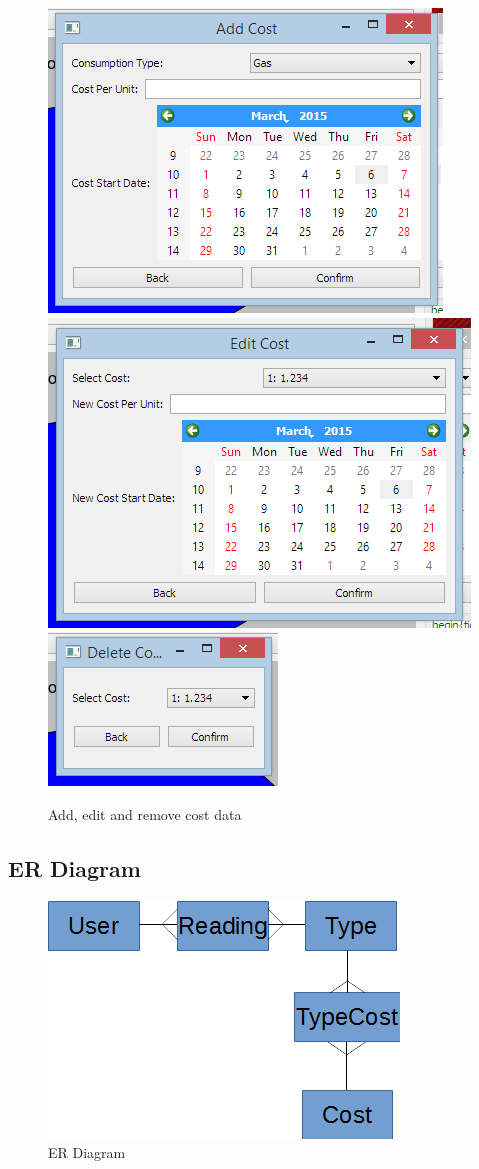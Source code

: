 \begin{figure}[H]
	\includegraphics{./maintenance/images/UI_Add_Cost.png}
	\includegraphics{./maintenance/images/UI_Edit_Cost.png}
	\includegraphics{./maintenance/images/UI_Remove_Cost.png}
	\caption{Add, edit and remove cost data}
\end{figure}

\subsection{ER Diagram}
\begin{figure}[H]
	\includegraphics{./maintenance/images/ER_Diagrams.png}
	\caption{ER Diagram}
\end{figure}

